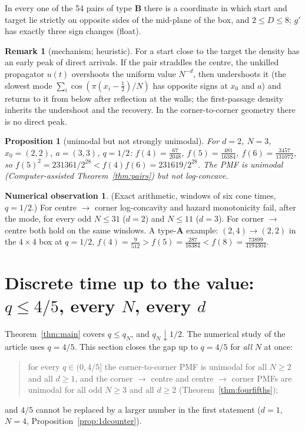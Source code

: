\documentclass[11pt,a4paper]{article}
\newtheorem{proposition}[theorem]{Proposition}
\theoremstyle{definition}
\newtheorem{observation}[theorem]{Numerical observation}
\newtheorem{remark}[theorem]{Remark}
\begin{document}
In every one of the 54 pairs of type \textbf{B} there is a coordinate in which start and target lie strictly on opposite sides of the mid-plane of the box, and $2\le D\le8$; $g'$ has exactly three sign changes (float).

\begin{remark}[mechanism; heuristic]\label{rem:mechanism}
For a start close to the target the density has an early peak of direct arrivals. If the pair straddles the centre, the unkilled propagator $u(t)$ overshoots the uniform value $N^{-d}$, then undershoots it (the slowest mode $\sum_i\cos(\pi(x_i-\frac12)/N)$ has opposite signs at $x_0$ and $a$) and returns to it from below after reflection at the walls; the first-passage density inherits the undershoot and the recovery. In the corner-to-corner geometry there is no direct peak.
\end{remark}

\begin{proposition}[unimodal but not strongly unimodal]\label{prop:notlc}
For $d=2$, $N=3$, $x_0=(2,2)$, $a=(3,3)$, $q=1/2$: $f(4)=\frac{67}{2048}$, $f(5)=\frac{481}{16384}$, $f(6)=\frac{3457}{131072}$, so $f(5)^2=231361/2^{28}<f(4)f(6)=231619/2^{28}$. The PMF is unimodal (Computer-assisted Theorem~\ref{thm:pairs}) but not log-concave.
\end{proposition}

\begin{observation}\label{obs:lc}
(Exact arithmetic, windows of six cone times, $q=1/2$.) For centre $\to$ corner log-concavity and hazard monotonicity fail, after the mode, for every odd $N\le31$ ($d=2$) and $N\le11$ ($d=3$). For corner $\to$ centre both hold on the same windows. A type-\textbf{A} example: $(2,4)\to(2,2)$ in the $4\times4$ box at $q=1/2$, $f(4)=\frac9{512}>f(5)=\frac{287}{16384}<f(8)=\frac{73899}{4194304}$.
\end{observation}

\section{Discrete time up to the value: $q\le4/5$, every $N$, every $d$}\label{sec:fourfifths}

Theorem~\ref{thm:main} covers $q\le q_N$, and $q_N\downarrow1/2$. The numerical study of the article uses $q=4/5$. This section closes the gap up to $q=4/5$ for \emph{all} $N$ at once:
\begin{quote}
for every $q\in(0,4/5]$ the corner-to-corner PMF is unimodal for all $N\ge2$ and all $d\ge1$, and the corner $\to$ centre and centre $\to$ corner PMFs are unimodal for all odd $N\ge3$ and all $d\ge2$ (Theorem~\ref{thm:fourfifths});
\end{quote}
and $4/5$ cannot be replaced by a larger number in the first statement ($d=1$, $N=4$, Proposition~\ref{prop:1dcounter}).
\end{document}
